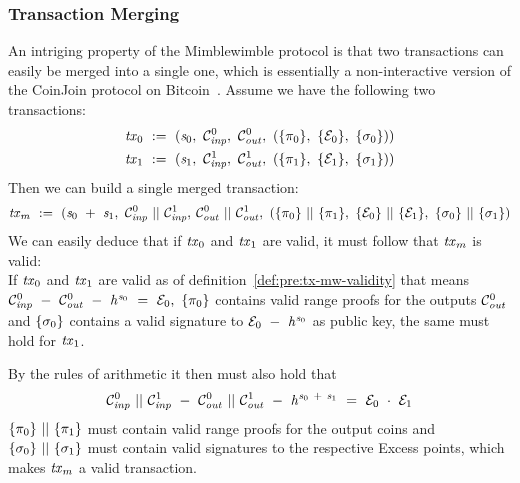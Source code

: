 \subsubsection{Transaction Merging \label{sec:pre:mimblewimble:merge}}
An intriging property of the Mimblewimble protocol is that two transactions can easily be merged into a single one, which is essentially a non-interactive version of the CoinJoin protocol on Bitcoin~\cite{maxwell2013coinjoin}.
Assume we have the following two transactions:
\begin{gather*}
    \mathit{tx}_0 ~:=~ (\mathit{s}_0 ,~ \mathcal{C}_{\mathit{inp}}^0 ,~ \mathcal{C}_{\mathit{out}}^0 ,~ (\{\pi_0\} ,~ \{\mathcal{E}_0\} ,~ \{\sigma_0\}) )\\
    \mathit{tx}_1 ~:=~ (\mathit{s}_1 ,~ \mathcal{C}_{\mathit{inp}}^1 ,~ \mathcal{C}_{\mathit{out}}^1 ,~ (\{\pi_1\} ,~ \{\mathcal{E}_1\} ,~ \{\sigma_1\}) )\\
\end{gather*}
Then we can build a single merged transaction:
\[ \mathit{tx}_m ~:=~ (\mathit{s}_0 ~+~ \mathit{s}_1 ,~ \mathcal{C}_{\mathit{inp}}^0 ~||~ \mathcal{C}_{\mathit{inp}}^1,\:\mathcal{C}_{\mathit{out}}^0 ~||~ \mathcal{C}_{\mathit{out}}^1 ,~ (\{\pi_0\} ~||~ \{\pi_1\} ,~
\{\mathcal{E}_0\} ~||~ \{\mathcal{E}_1\} ,~ \{\sigma_0\} ~||~ \{\sigma_1\}) \]
We can easily deduce that if $\mathit{tx}_0$ and $\mathit{tx}_1$ are valid, it must follow that $\mathit{tx}_m$ is valid:\\
If $\mathit{tx}_0$ and $\mathit{tx}_1$ are valid as of definition~\ref{def:pre:tx-mw-validity} that means $\mathcal{C}_{\mathit{inp}}^0 ~-~ \mathcal{C}_{\mathit{out}}^0 ~-~ \mathit{h}^{\mathit{s}_0} ~=~ \mathcal{E}_0 ,~ \{\pi_0\}$ contains valid range proofs for the outputs
$\mathcal{C}_{\mathit{out}}^0$ and $\{\sigma_0\}$ contains a valid signature to $\mathcal{E}_0 ~-~ \mathit{h}^{\mathit{s}_0}$ as public key, the same must hold for $\mathit{tx}_1$.

By the rules of arithmetic it then must also hold that
\[ \mathcal{C}_{\mathit{inp}}^0 ~||~ \mathcal{C}_{\mathit{inp}}^1 ~-~ \mathcal{C}_{\mathit{out}}^0 ~||~ \mathcal{C}_{\mathit{out}}^1 ~-~ \mathit{h}^{\mathit{s}_0 ~+~ \mathit{s}_1} ~=~ \mathcal{E}_0 ~\cdot~ \mathcal{E}_1  \]
$\{\pi_0\} ~||~ \{\pi_1\}$ must contain valid range proofs for the output coins and $\{\sigma_0\} ~||~ \{\sigma_1\}$ must contain valid signatures to the respective Excess points, which makes $\mathit{tx}_m$ a valid transaction.

